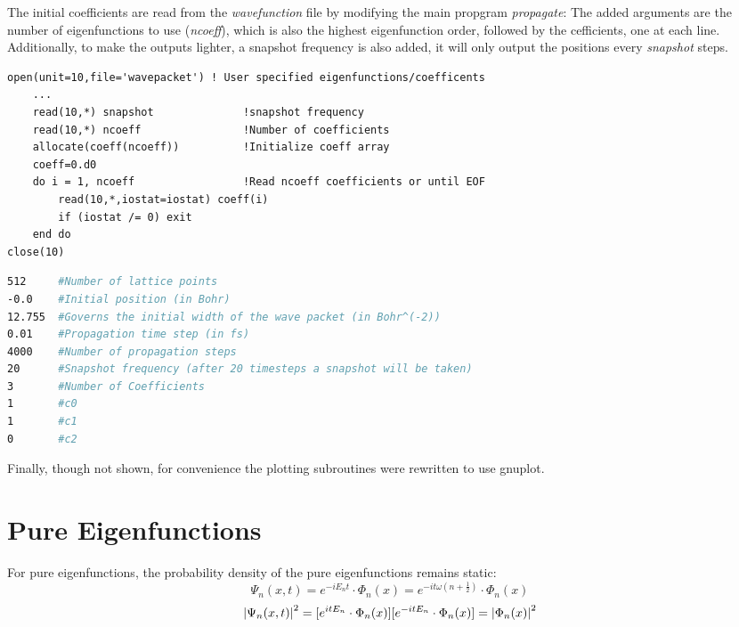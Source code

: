 \documentclass{cis320}
\begin{document}
The initial coefficients are read from the \textit{wavefunction} file by modifying the main propgram \textit{propagate}: The added arguments are the number of eigenfunctions to use (\textit{ncoeff}), which is also the highest eigenfunction order, followed by the cefficients, one at each line.
Additionally, to make the outputs lighter, a snapshot frequency is also added, it will only output the positions every \textit{snapshot} steps. 
    \begin{lstlisting}[caption=Reading the coefficients in the main program]
open(unit=10,file='wavepacket') ! User specified eigenfunctions/coefficents
    ...
    read(10,*) snapshot              !snapshot frequency
    read(10,*) ncoeff                !Number of coefficients
    allocate(coeff(ncoeff))          !Initialize coeff array
    coeff=0.d0
    do i = 1, ncoeff                 !Read ncoeff coefficients or until EOF 
        read(10,*,iostat=iostat) coeff(i)
        if (iostat /= 0) exit 
    end do
close(10) \end{lstlisting}

    \begin{lstlisting}[language=bash, caption=Wavefunction input file]
512     #Number of lattice points
-0.0    #Initial position (in Bohr)
12.755  #Governs the initial width of the wave packet (in Bohr^(-2))
0.01    #Propagation time step (in fs)
4000    #Number of propagation steps
20      #Snapshot frequency (after 20 timesteps a snapshot will be taken)
3       #Number of Coefficients
1       #c0
1       #c1
0       #c2\end{lstlisting}

Finally, though not shown, for convenience the plotting subroutines were rewritten to use gnuplot.

\section{Pure Eigenfunctions}
For pure eigenfunctions, the probability density of the pure eigenfunctions remains static:
\[
\Psi_{n}(x,t) = e^{-iE_nt} \cdot \Phi_{n}(x) = e^{-it\omega(n+\frac{1}{2})} \cdot \Phi_{n}(x) 
\]\[
 \abs{\Psi_{n}(x,t)}^2 = [ e^{itE_n} \cdot \Phi_{n}(x)][e^{-itE_n} \cdot \Phi_{n}(x)] = \abs{\Phi_n(x)}^2 
\]
\end{document}
